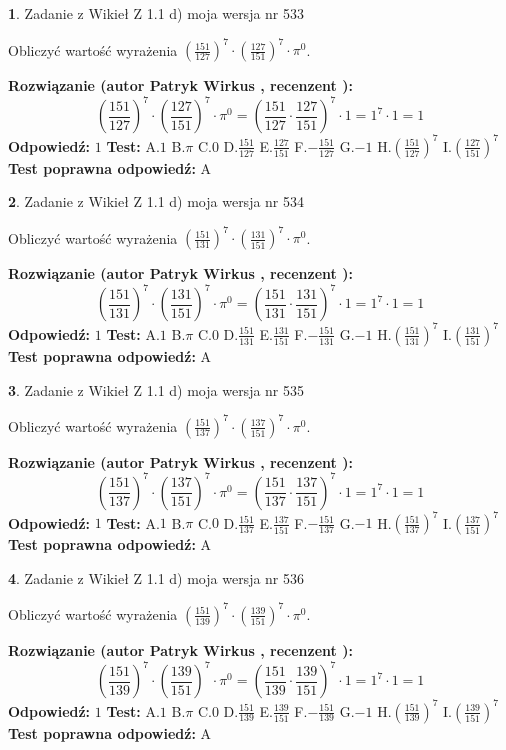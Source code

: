\documentclass[12pt, a4paper]{article}
\theoremstyle{definition} %
\newtheorem{zad}{}
\newcommand{\zadStart}[1]{\begin{zad}#1\newline}
\newcommand{\zadStop}{\end{zad}}
\newcommand{\rozwStart}[2]{\noindent \textbf{Rozwiązanie (autor #1 , recenzent #2): }\newline}
\newcommand{\rozwStop}{\newline}
\newcommand{\odpStart}{\noindent \textbf{Odpowiedź:}\newline}
\newcommand{\odpStop}{\newline}
\newcommand{\testStart}{\noindent \textbf{Test:}\newline}
\newcommand{\testStop}{\newline}
\newcommand{\kluczStart}{\noindent \textbf{Test poprawna odpowiedź:}\newline}
\newcommand{\kluczStop}{\newline}
\begin{document}
\zadStart{Zadanie z Wikieł Z 1.1 d) moja wersja nr 533}

Obliczyć wartość wyrażenia $(\frac{151}{127})^{7} \cdot (\frac{127}{151})^{7} \cdot \pi^{0}$.
\zadStop
\rozwStart{Patryk Wirkus}{}
$$(\frac{151}{127})^{7} \cdot (\frac{127}{151})^{7} \cdot \pi^{0} = (\frac{151}{127} \cdot \frac{127}{151})^{7} \cdot 1 = 1^{7} \cdot 1 = 1$$
\rozwStop
\odpStart
$1$
\odpStop
\testStart
A.$1$ B.$\pi$ C.$0$ D.$\frac{151}{127}$ E.$\frac{127}{151}$
F.$-\frac{151}{127}$ G.$-1$
H.$(\frac{151}{127})^{7}$
I.$(\frac{127}{151})^{7}$
\testStop
\kluczStart
A
\kluczStop



\zadStart{Zadanie z Wikieł Z 1.1 d) moja wersja nr 534}

Obliczyć wartość wyrażenia $(\frac{151}{131})^{7} \cdot (\frac{131}{151})^{7} \cdot \pi^{0}$.
\zadStop
\rozwStart{Patryk Wirkus}{}
$$(\frac{151}{131})^{7} \cdot (\frac{131}{151})^{7} \cdot \pi^{0} = (\frac{151}{131} \cdot \frac{131}{151})^{7} \cdot 1 = 1^{7} \cdot 1 = 1$$
\rozwStop
\odpStart
$1$
\odpStop
\testStart
A.$1$ B.$\pi$ C.$0$ D.$\frac{151}{131}$ E.$\frac{131}{151}$
F.$-\frac{151}{131}$ G.$-1$
H.$(\frac{151}{131})^{7}$
I.$(\frac{131}{151})^{7}$
\testStop
\kluczStart
A
\kluczStop



\zadStart{Zadanie z Wikieł Z 1.1 d) moja wersja nr 535}

Obliczyć wartość wyrażenia $(\frac{151}{137})^{7} \cdot (\frac{137}{151})^{7} \cdot \pi^{0}$.
\zadStop
\rozwStart{Patryk Wirkus}{}
$$(\frac{151}{137})^{7} \cdot (\frac{137}{151})^{7} \cdot \pi^{0} = (\frac{151}{137} \cdot \frac{137}{151})^{7} \cdot 1 = 1^{7} \cdot 1 = 1$$
\rozwStop
\odpStart
$1$
\odpStop
\testStart
A.$1$ B.$\pi$ C.$0$ D.$\frac{151}{137}$ E.$\frac{137}{151}$
F.$-\frac{151}{137}$ G.$-1$
H.$(\frac{151}{137})^{7}$
I.$(\frac{137}{151})^{7}$
\testStop
\kluczStart
A
\kluczStop



\zadStart{Zadanie z Wikieł Z 1.1 d) moja wersja nr 536}

Obliczyć wartość wyrażenia $(\frac{151}{139})^{7} \cdot (\frac{139}{151})^{7} \cdot \pi^{0}$.
\zadStop
\rozwStart{Patryk Wirkus}{}
$$(\frac{151}{139})^{7} \cdot (\frac{139}{151})^{7} \cdot \pi^{0} = (\frac{151}{139} \cdot \frac{139}{151})^{7} \cdot 1 = 1^{7} \cdot 1 = 1$$
\rozwStop
\odpStart
$1$
\odpStop
\testStart
A.$1$ B.$\pi$ C.$0$ D.$\frac{151}{139}$ E.$\frac{139}{151}$
F.$-\frac{151}{139}$ G.$-1$
H.$(\frac{151}{139})^{7}$
I.$(\frac{139}{151})^{7}$
\testStop
\kluczStart
A
\kluczStop
\end{document}
